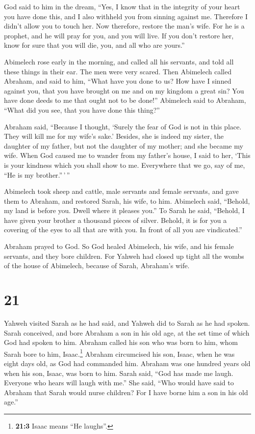 God said to him in the dream, ``Yes, I know that in the
integrity of your heart you have done this, and I also withheld you from
sinning against me. Therefore I didn't allow you to touch her.
 Now therefore, restore the man's wife. For he is a
prophet, and he will pray for you, and you will live. If you don't
restore her, know for sure that you will die, you, and all who are
yours.''

 Abimelech rose early in the morning, and called all his
servants, and told all these things in their ear. The men were very
scared.  Then Abimelech called Abraham, and said to him,
``What have you done to us? How have I sinned against you, that you have
brought on me and on my kingdom a great sin? You have done deeds to me
that ought not to be done!''  Abimelech said to Abraham,
``What did you see, that you have done this thing?''

 Abraham said, ``Because I thought, `Surely the fear of
God is not in this place. They will kill me for my wife's sake.'
 Besides, she is indeed my sister, the daughter of my
father, but not the daughter of my mother; and she became my wife.
 When God caused me to wander from my father's house, I
said to her, `This is your kindness which you shall show to me.
Everywhere that we go, say of me, ``He is my brother.''\,'\,''

 Abimelech took sheep and cattle, male servants and
female servants, and gave them to Abraham, and restored Sarah, his wife,
to him.  Abimelech said, ``Behold, my land is before you.
Dwell where it pleases you.''  To Sarah he said,
``Behold, I have given your brother a thousand pieces of silver. Behold,
it is for you a covering of the eyes to all that are with you. In front
of all you are vindicated.''

 Abraham prayed to God. So God healed Abimelech, his
wife, and his female servants, and they bore children. 
For Yahweh had closed up tight all the wombs of the house of Abimelech,
because of Sarah, Abraham's wife.

\hypertarget{section-20}{%
\section{21}\label{section-20}}

 Yahweh visited Sarah as he had said, and Yahweh did to
Sarah as he had spoken.  Sarah conceived, and bore Abraham
a son in his old age, at the set time of which God had spoken to him.
 Abraham called his son who was born to him, whom Sarah
bore to him, Isaac.\footnote{\textbf{21:3} Isaac means ``He laughs''.}
 Abraham circumcised his son, Isaac, when he was eight
days old, as God had commanded him.  Abraham was one
hundred years old when his son, Isaac, was born to him. 
Sarah said, ``God has made me laugh. Everyone who hears will laugh with
me.''  She said, ``Who would have said to Abraham that
Sarah would nurse children? For I have borne him a son in his old age.''

